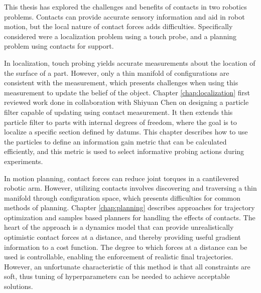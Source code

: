 \documentclass[../thesis.tex]{subfiles}
\begin{document}

This thesis has explored the challenges and benefits of contacts in two robotics problems.
Contacts can provide accurate sensory information and aid in robot motion, but the local nature of contact forces adds difficulties.
Specifically considered were a localization problem using a touch probe, and a planning problem using contacts for support.

In localization, touch probing yields accurate measurements about the location of the surface of a part.
However, only a thin manifold of configurations are consistent with the measurement, which presents challenges when using this measurement to update the belief of the object.
Chapter \ref{chap:localization} first reviewed work done in collaboration with Shiyuan Chen \cite{Saund2017} on designing a particle filter capable of updating using contact measurement.
It then extends this particle filter to parts with internal degrees of freedom, where the goal is to localize a specific section defined by datums.
This chapter describes how to use the particles to define an information gain metric that can be calculated efficiently, and this metric is used to select informative probing actions during experiments.

In motion planning, contact forces can reduce joint torques in a cantilevered robotic arm.
However, utilizing contacts involves discovering and traversing a thin manifold through configuration space, which presents difficulties for common methods of planning.
Chapter \ref{chap:planning} describes approaches for trajectory optimization and samples based planners for handling the effects of contacts.
The heart of the approach is a dynamics model that can provide unrealistically optimistic contact forces at a distance, and thereby providing useful gradient information to a cost function.
The degree to which forces at a distance can be used is controllable, enabling the enforcement of realistic final trajectories.
However, an unfortunate characteristic of this method is that all constraints are soft, thus tuning of hyperparameters can be needed to achieve acceptable solutions.
\end{document}
